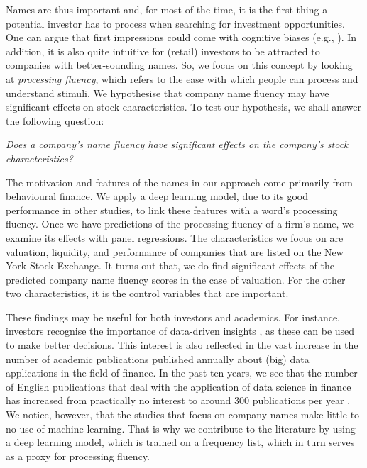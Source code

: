 \documentclass[11pt]{article}
\begin{document}
Names are thus important and, for most of the time, it is the first thing a potential investor has to process when searching for investment opportunities. One can argue that first impressions could come with cognitive biases (e.g., \cite{hirshleifer2021first}). In addition, it is also quite intuitive for (retail) investors to be attracted to companies with better-sounding names.
So, we focus on this concept by looking at \textit{processing fluency}, which refers to the ease with which people can process and understand stimuli.
We hypothesise that company name fluency may have significant effects on stock characteristics.
To test our hypothesis, we shall answer the following question:
\vspace{0.25cm}
\begin{center}  
    \textit{Does a company's name fluency have significant effects on the company's stock characteristics?}
\end{center}
\vspace{0.25cm}

The motivation and features of the names in our approach come primarily from behavioural finance. We apply a deep learning model, due to its good performance in other studies, to link these features with a word's processing fluency. Once we have predictions of the processing fluency of a firm's name, we examine its effects with panel regressions.
The characteristics we focus on are valuation, liquidity, and performance of companies that are listed on the New York Stock Exchange. 
It turns out that, we do find significant effects of the predicted company name fluency scores in the case of valuation. For the other two characteristics, it is the control variables that are important.

These findings may be useful for both investors and academics. For instance, investors recognise the importance of data-driven insights \citep{yin2015big}, as these can be used to make better decisions.
This interest is also reflected in the vast increase in the number of academic publications published annually about (big) data applications in the field of finance. In the past ten years, we see that the number of English publications that deal with the application of data science in finance has increased from practically no interest to around 300 publications per year \citep{nobanee2021bibliometric}. We notice, however, that the studies that focus on company names make little to no use of machine learning. That is why
we contribute to the literature by using a deep learning model, which is trained on a frequency list, which in turn serves as a proxy for processing fluency.
\end{document}
